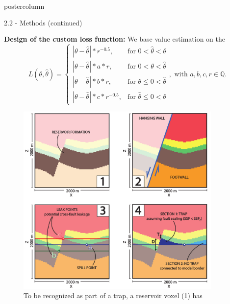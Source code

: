 \documentclass{beamer}
\begin{document}
\begin{frame}
\begin{columns}
\begin{column}{.499\textwidth}
\begin{beamercolorbox}[center]{postercolumn}
\begin{minipage}{.98\textwidth}
{\begin{myblock}{2.2 - Methods (continued)}
								\begin{minipage}[h]{0.598\textwidth} %
								\textbf{Design of the custom loss function:}
								We base value estimation on the 
								\begin{equation}\label{eq:LFR_final}
																L(\theta,\hat{\theta}) =
																\begin{cases}
																|\theta - \hat{\theta}|*r^{-0.5}, & \text{for } 0<\hat{\theta}<\theta  \\
																|\theta-\hat{\theta}|*a*r, & \text{for } 0<\theta<\hat{\theta} \\
																|\theta-\hat{\theta}|*b*r, & \text{for } \theta\leq0<\hat{\theta} \\
																|\theta-\hat{\theta}|*c*r^{-0.5}, & \text{for } \hat{\theta}\leq0<\theta 
																\end{cases},
																\text{ with } a,b,c,r \in \mathbb{Q}.
																\end{equation}
								\end{minipage}
								\begin{minipage}{0.398\textwidth}
								\begin{figure}
									\centering\includegraphics[width=0.9\textwidth]{figures/Trap_Cond_H.pdf}
									\caption{To be recognized as part of a trap, a reservoir voxel (1) has
}
\end{figure}
\end{minipage}
\end{myblock}}
\end{minipage}
\end{beamercolorbox}
\end{column}
\end{columns}
\end{frame}
\end{document}

